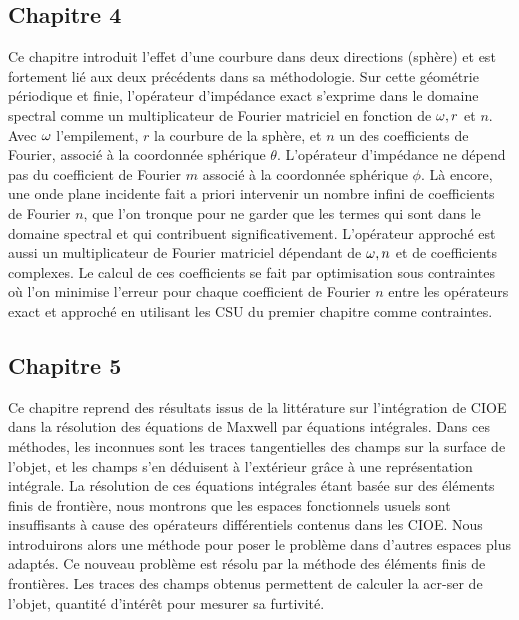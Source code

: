 \subsection*{Chapitre 4}
Ce chapitre introduit l'effet d'une courbure dans deux directions (sphère) et est fortement lié aux deux précédents dans sa méthodologie.
Sur cette géométrie périodique et finie, l'opérateur d'impédance exact s'exprime dans le domaine spectral comme un multiplicateur de Fourier matriciel en fonction de \(\omega, r\) et \(n\). Avec \(\omega\) l'empilement, \(r\) la courbure de la sphère, et \(n\) un des coefficients de Fourier, associé à la coordonnée sphérique \(\theta\).
L'opérateur d'impédance ne dépend pas du coefficient de Fourier \(m\) associé à la coordonnée sphérique \(\phi\).
Là encore, une onde plane incidente fait a priori intervenir un nombre infini de coefficients de Fourier \(n\), que l'on tronque pour ne garder que les termes qui sont dans le domaine spectral et qui contribuent significativement.
L'opérateur approché est aussi un multiplicateur de Fourier matriciel dépendant de \(\omega, n\) et de coefficients complexes.
Le calcul de ces coefficients se fait par optimisation sous contraintes où l'on minimise l'erreur pour chaque coefficient de Fourier \(n\) entre les opérateurs exact et approché en utilisant les CSU du premier chapitre comme contraintes.

\subsection*{Chapitre 5}
Ce chapitre reprend des résultats issus de la littérature sur l'intégration de CIOE dans la résolution des équations de Maxwell par équations intégrales.
Dans ces méthodes, les inconnues sont les traces tangentielles des champs sur la surface de l'objet, et les champs s'en déduisent à l'extérieur grâce à une représentation intégrale.
La résolution de ces équations intégrales étant basée sur des éléments finis de frontière, nous montrons que les espaces fonctionnels usuels sont insuffisants à cause des opérateurs différentiels contenus dans les CIOE.
Nous introduirons alors une méthode pour poser le problème dans d'autres espaces plus adaptés. Ce nouveau problème est résolu par la méthode des éléments finis de frontières. Les traces des champs obtenus permettent de calculer la \gls{acr-ser} de l'objet, quantité d'intérêt pour mesurer sa furtivité.
